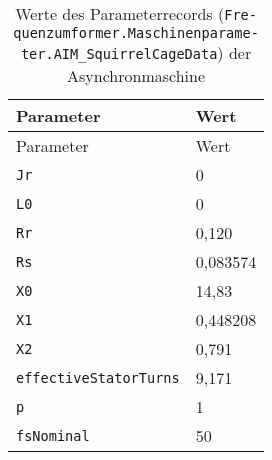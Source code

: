 \begin{longtable}[]{@{}ll@{}}
\caption{Werte des Parameterrecords (\texttt{Fre­quenz­um­for­mer.­Ma­schi­nen­pa­ra­me­ter.­AIM\_­Squir­rel­Cage­Da­ta}) der Asynchronmaschine}\label{tab:WerteParameterrecordASM}\tabularnewline
\toprule
Parameter                     & Wert     \\
\midrule
\endfirsthead
\toprule
Parameter                     & Wert     \\
\midrule
\endhead
\texttt{Jr}                   & 0        \\
\texttt{L0}                   & 0        \\
\texttt{Rr}                   & 0,120    \\
\texttt{Rs}                   & 0,083574 \\
\texttt{X0}                   & 14,83    \\
\texttt{X1}                   & 0,448208 \\
\texttt{X2}                   & 0,791    \\
\texttt{effectiveStatorTurns} & 9,171    \\
\texttt{p}                    & 1        \\
\texttt{fsNominal}            & 50       \\
\bottomrule
\end{longtable}

